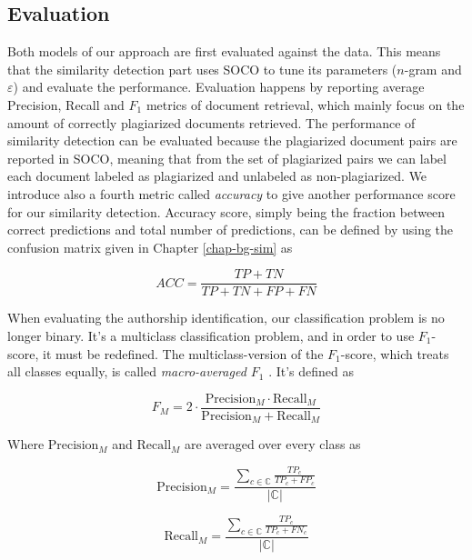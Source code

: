 \subsection{Evaluation} \label{chap-method-evaluation}

Both models of our approach are first evaluated against the data. This means that the similarity detection part uses SOCO to tune its parameters ($n$-gram and $\varepsilon$) and evaluate the performance. Evaluation happens by reporting average Precision, Recall and $F_1$ metrics of document retrieval, which mainly focus on the amount of correctly plagiarized documents retrieved. The performance of similarity detection can be evaluated because the plagiarized document pairs are reported in SOCO, meaning that from the set of plagiarized pairs we can label each document labeled as plagiarized and unlabeled as non-plagiarized. We introduce also a fourth metric called \emph{accuracy} to give another performance score for our similarity detection. Accuracy score, simply being the fraction between correct predictions and total number of predictions, can be defined by using the confusion matrix given in Chapter \ref{chap-bg-sim} as

\begin{equation}
    ACC = \dfrac{TP + TN}{TP + TN + FP + FN}
\end{equation}

When evaluating the authorship identification, our classification problem is no longer binary. It's a multiclass classification problem, and in order to use $F_1$-score, it must be redefined. The multiclass-version of the $F_1$-score, which treats all classes equally, is called \emph{macro-averaged $F_1$} \cite{SOKOLOVA2009427}. It's defined as 

\begin{equation}
    F_M = 2 \cdot \dfrac{\text{Precision}_M \cdot \text{Recall}_M}{\text{Precision}_M + \text{Recall}_M}
\end{equation}

\noindent
Where $\text{Precision}_M$ and $\text{Recall}_M$ are averaged over every class as

\begin{equation}
    \text{Precision}_M = \dfrac{\sum \limits_{c \in \mathbb{C}}
        \frac{TP_c}
             {TP_c + FP_c}}
    {|\mathbb{C}|}
\end{equation}

\begin{equation}
    \text{Recall}_M = \dfrac{\sum \limits_{c \in \mathbb{C}}
        \frac{TP_c}
             {TP_c + FN_c}}
    {|\mathbb{C}|}
\end{equation}



